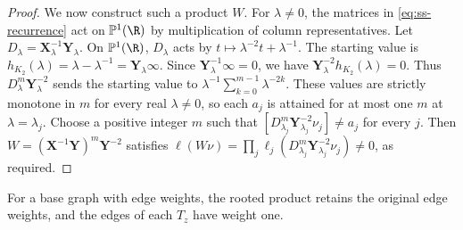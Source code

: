 \begin{proof}
We now construct such a product $W$.
For $\lambda\ne0$, the matrices in \cref{eq:ss-recurrence} act on
$\mathbb P^1(\R)$ by multiplication of column representatives.
Let $D_\lambda=\mathbf{X}_\lambda^{-1}\mathbf{Y}_\lambda$.
On $\mathbb P^1(\R)$, $D_\lambda$ acts by
$t\mapsto\lambda^{-2}t+\lambda^{-1}$.
The starting value is $h_{K_2}(\lambda)=\lambda-\lambda^{-1}=\mathbf{Y}_\lambda\infty$.
Since $\mathbf{Y}_\lambda^{-1}\infty=0$, we have
$\mathbf{Y}_\lambda^{-2}h_{K_2}(\lambda)=0$.
Thus $D_\lambda^m\mathbf{Y}_\lambda^{-2}$ sends the starting value to
$\lambda^{-1}\sum_{k=0}^{m-1}\lambda^{-2k}$.
These values are strictly monotone in $m$ for every real $\lambda\ne0$,
so each $a_j$ is attained for at most one $m$ at $\lambda=\lambda_j$.
Choose a positive integer $m$ such that
$[D_{\lambda_j}^m\mathbf{Y}_{\lambda_j}^{-2}\nu_j]\ne a_j$ for every $j$.
Then $W=(\mathbf{X}^{-1}\mathbf{Y})^m\mathbf{Y}^{-2}$ satisfies
$\ell(W\nu)=\prod_j\ell_j(D_{\lambda_j}^m\mathbf{Y}_{\lambda_j}^{-2}\nu_j)\ne0$,
as required.
\end{proof}

For a base graph with edge weights, the rooted product retains the
original edge weights, and the edges of each $T_z$ have weight one.

